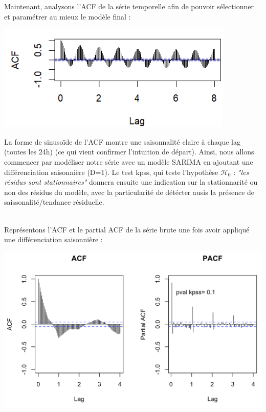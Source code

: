 \documentclass{article}
\theoremstyle{definition}
\theoremstyle{remark}
\begin{document}
Maintenant, analysons l'ACF de la série temporelle afin de pouvoir sélectionner et paramétrer au mieux le modèle final :\newline \\
\begin{minipage}{.5\textwidth}
\hspace{-1cm}
\includegraphics[width=0.95\linewidth]{fig3.png}
    \label{fig:enter-label}
\end{minipage}
\begin{minipage}{.5\textwidth}
    La forme de sinusoïde de l'ACF montre une saisonnalité claire à chaque lag (toutes les 24h) (ce qui vient confirmer l'intuition de départ). Ainsi, nous allons commencer par modéliser notre série avec un modèle SARIMA en ajoutant une différenciation saisonnière (D=1). Le test kpss, qui teste l'hypothèse $\mathcal{H}_0$ : \textit{"les résidus sont stationnaires"} donnera ensuite une indication sur la stationnarité ou non des résidus du modèle, avec la particularité de détécter ausis la présence de saissonalité/tendance résiduelle.
\end{minipage}
\newline
\\
Représentons l'ACF et le partial ACF de la série brute une fois avoir appliqué une différenciation saisonnière :
\FloatBarrier
\begin{minipage}{.5\textwidth}
\hspace{-1cm}
\includegraphics[width=0.95\linewidth]{fig4.png}
    \label{fig:enter-label}
\end{minipage}
\end{document}
